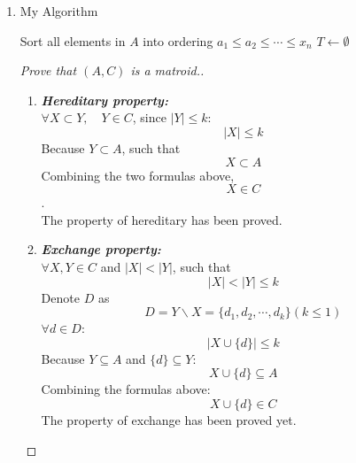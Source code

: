 \documentclass[12pt,a4paper]{article}
\makeatletter
\newtheorem*{solution}{Solution}
\theoremstyle{definition}
\renewenvironment{solution}[1][Solution] {\par\pushQED{\qed}\normalfont\topsep6\p@\@plus6\p@\relax\trivlist\item[\hskip\labelsep\bfseries#1\@addpunct{.}]\ignorespaces}{\popQED\endtrivlist\@endpefalse} \makeatother
\makeatother
\begin{document}
\begin{enumerate}
\begin{enumerate}
\begin{solution}
	\begin{algorithm}[H]
		
		\BlankLine
		\caption{My Algorithm}\label{Alg-my_algorithm}
		
		Sort all elements in $A$ into ordering $a_1\leq a_2\leq \cdots \leq x_n$\;
		$T\leftarrow \emptyset$\;
	\end{algorithm}
	    \begin{proof}[Prove that $(A,C)$ is a matroid.]
	    ~\\
	    \begin{enumerate}
	   	\item
	   	\textbf{\textit{Hereditary property:}}\\
	   	$\forall X\subset Y,\quad Y\in C$, since $|Y|\leq k$:
	   	$$|X|\leq k$$
	   	Because $Y\subset A$, such that $$X\subset A$$
	   	Combining the two formulas above, $$X\in C$$.\\
	    The property of hereditary has been proved.
			   	
	   	\item
	   	\textbf{\textit{Exchange property:}}\\
	   	$\forall X,Y\in C$ and $|X|<|Y|$, such that
	   	$$|X|<|Y|\leq k$$
	   	Denote $D$ as
	   	$$D=Y\backslash X=\{d_1,d_2,\cdots,d_k \}(k\leq 1)$$
	   	$\forall d\in D$: $$|X\cup \{d\}|\leq k$$
	   	Because $Y\subseteq A$ and $ \{d\}\subseteq Y$:
	   	$$X\cup \{d\}\subseteq A$$
	   	Combining the formulas above: $$X\cup \{d\}\in C$$
	   	The property of exchange has been proved yet.
	    \end{enumerate}
	    \end{proof}
	    \end{solution}


\end{enumerate}
\end{enumerate}
\end{document}
